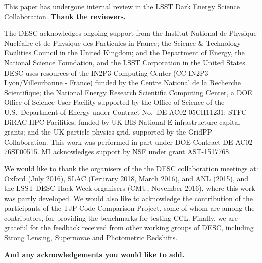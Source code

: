 %
This paper has undergone internal review in the LSST Dark Energy Science Collaboration. {\bf Thank the reviewers.}

The DESC acknowledges ongoing support from the Institut National de Physique Nucl\'eaire et de Physique des Particules in France; the Science \& Technology Facilities Council in the United Kingdom; and the Department of Energy, the National Science Foundation, and the LSST Corporation in the United States.  DESC uses resources of the IN2P3 Computing Center (CC-IN2P3--Lyon/Villeurbanne - France) funded by the Centre National de la Recherche Scientifique; the National Energy Research Scientific Computing Center, a DOE Office of Science User Facility supported by the Office of Science of the U.S.\ Department of Energy under Contract No.\ DE-AC02-05CH11231; STFC DiRAC HPC Facilities, funded by UK BIS National E-infrastructure capital grants; and the UK particle physics grid, supported by the GridPP Collaboration.  This work was performed in part under DOE Contract DE-AC02-76SF00515. MI acknowledges support by NSF under grant AST-1517768.

We would like to thank the organisers of the the DESC collaboration meetings at: Oxford (July 2016), SLAC (Ferurary 2018, March 2016), and ANL (2015), and the LSST-DESC Hack Week organisers (CMU, November 2016), where this work 
was partly developed. We would also like to acknowledge the contribution of the participants of the TJP Code Comparison Project, some of whom are among the \ccl contributors, for providing the benchmarks for  testing CCL. Finally, we are grateful for the feedback received from other working groups of DESC, including Strong Lensing, Supernovae and Photometric Redshifts.

%
{\bf And any acknowledgements you would like to add.}

 
